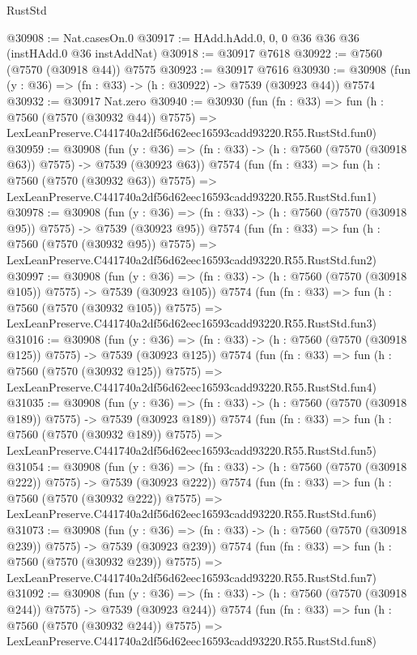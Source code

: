 \begin{lexlean}{RustStd}
\begin{coremodule}
@30908 := Nat.casesOn.{0}
@30917 := HAdd.hAdd.{0, 0, 0} @36 @36 @36 (instHAdd.{0} @36 instAddNat)
@30918 := @30917 @7618
@30922 := @7560 (@7570 (@30918 @44)) @7575
@30923 := @30917 @7616
@30930 := @30908 (fun (y : @36) => (fn : @33) -> (h : @30922) -> @7539 (@30923 @44)) @7574
@30932 := @30917 Nat.zero
@30940 := @30930
    (fun (fn : @33) =>
    fun (h : @7560 (@7570 (@30932 @44)) @7575) =>
    LexLeanPreserve.C441740a2df56d62eec16593cadd93220.R55.RustStd.fun0)
@30959 := @30908
    (fun (y : @36) => (fn : @33) -> (h : @7560 (@7570 (@30918 @63)) @7575) -> @7539 (@30923 @63))
    @7574
    (fun (fn : @33) =>
    fun (h : @7560 (@7570 (@30932 @63)) @7575) =>
    LexLeanPreserve.C441740a2df56d62eec16593cadd93220.R55.RustStd.fun1)
@30978 := @30908
    (fun (y : @36) => (fn : @33) -> (h : @7560 (@7570 (@30918 @95)) @7575) -> @7539 (@30923 @95))
    @7574
    (fun (fn : @33) =>
    fun (h : @7560 (@7570 (@30932 @95)) @7575) =>
    LexLeanPreserve.C441740a2df56d62eec16593cadd93220.R55.RustStd.fun2)
@30997 := @30908
    (fun (y : @36) => (fn : @33) -> (h : @7560 (@7570 (@30918 @105)) @7575) -> @7539 (@30923 @105))
    @7574
    (fun (fn : @33) =>
    fun (h : @7560 (@7570 (@30932 @105)) @7575) =>
    LexLeanPreserve.C441740a2df56d62eec16593cadd93220.R55.RustStd.fun3)
@31016 := @30908
    (fun (y : @36) => (fn : @33) -> (h : @7560 (@7570 (@30918 @125)) @7575) -> @7539 (@30923 @125))
    @7574
    (fun (fn : @33) =>
    fun (h : @7560 (@7570 (@30932 @125)) @7575) =>
    LexLeanPreserve.C441740a2df56d62eec16593cadd93220.R55.RustStd.fun4)
@31035 := @30908
    (fun (y : @36) => (fn : @33) -> (h : @7560 (@7570 (@30918 @189)) @7575) -> @7539 (@30923 @189))
    @7574
    (fun (fn : @33) =>
    fun (h : @7560 (@7570 (@30932 @189)) @7575) =>
    LexLeanPreserve.C441740a2df56d62eec16593cadd93220.R55.RustStd.fun5)
@31054 := @30908
    (fun (y : @36) => (fn : @33) -> (h : @7560 (@7570 (@30918 @222)) @7575) -> @7539 (@30923 @222))
    @7574
    (fun (fn : @33) =>
    fun (h : @7560 (@7570 (@30932 @222)) @7575) =>
    LexLeanPreserve.C441740a2df56d62eec16593cadd93220.R55.RustStd.fun6)
@31073 := @30908
    (fun (y : @36) => (fn : @33) -> (h : @7560 (@7570 (@30918 @239)) @7575) -> @7539 (@30923 @239))
    @7574
    (fun (fn : @33) =>
    fun (h : @7560 (@7570 (@30932 @239)) @7575) =>
    LexLeanPreserve.C441740a2df56d62eec16593cadd93220.R55.RustStd.fun7)
@31092 := @30908
    (fun (y : @36) => (fn : @33) -> (h : @7560 (@7570 (@30918 @244)) @7575) -> @7539 (@30923 @244))
    @7574
    (fun (fn : @33) =>
    fun (h : @7560 (@7570 (@30932 @244)) @7575) =>
    LexLeanPreserve.C441740a2df56d62eec16593cadd93220.R55.RustStd.fun8)

\end{coremodule}
\end{lexlean}
